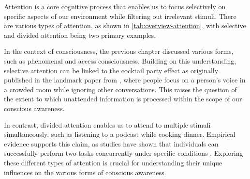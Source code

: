 \documentclass[10pt]{article}
\begin{document}
\begin{sloppypar}
  Attention is a core cognitive process that enables us to focus selectively on specific aspects of our environment while filtering out irrelevant stimuli. There are various types of attention, as shown in \autoref{tab:overview-attention}, with selective \citep{koivisto_relationship_2009} and divided attention \citep{mckanna_divided_2009} being two primary examples.

  In the context of consciousness, the previous chapter discussed various forms, such as phenomenal and access consciousness. Building on this understanding, selective attention can be linked to the cocktail party effect as originally published in the landmark paper from \cite{cherry_experiments_1953}, where people focus on a person’s voice in a crowded room while ignoring other conversations. This raises the question of the extent to which unattended information is processed within the scope of our conscious awareness.

  In contrast, divided attention enables us to attend to multiple stimuli simultaneously, such as listening to a podcast while cooking dinner. Empirical evidence supports this claim, as studies have shown that individuals can successfully perform two tasks concurrently under specific conditions \citep{rodrigue_spatio-temporal_2015}. Exploring these different types of attention is crucial for understanding their unique influences on the various forms of conscious awareness.

  \vspace{10pt} %
  \begin{table}[ht]
    \centering
    \renewcommand{\arraystretch}{1.5}
    \setlength{\tabcolsep}{12pt}
    \caption{Types of attention and their descriptions.}
    \label{tab:overview-attention}
  \end{table}


\end{sloppypar}
\end{document}
